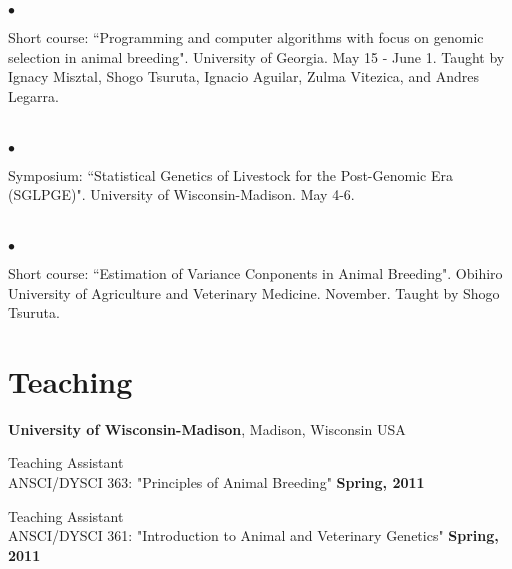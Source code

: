 \documentclass[margin,line,10pt]{res}
\newenvironment{list2}{
  \begin{list}{$\bullet$}{%
      \setlength{\itemsep}{0in}
      \setlength{\parsep}{0in} \setlength{\parskip}{0in}
      \setlength{\topsep}{0in} \setlength{\partopsep}{0in} 
      \setlength{\leftmargin}{0.2in}}}{\end{list}}
\begin{document}
\begin{resume}
\begin{list2}
\vspace{0.5cm}

\item Short course: ``Programming and computer algorithms with focus on genomic selection in animal breeding".  University of Georgia. May 15 - June 1.  
Taught by Ignacy Misztal, Shogo Tsuruta, Ignacio Aguilar, Zulma Vitezica, and  Andres Legarra. 
\end{list2}  

\section{}
\begin{list2}
\item Symposium: ``Statistical Genetics of Livestock for the Post-Genomic Era (SGLPGE)". University of Wisconsin-Madison. May 4-6. 
\end{list2}  

\section{}
\begin{list2}
\item Short course: ``Estimation of Variance Conponents in Animal Breeding". Obihiro University of Agriculture and Veterinary Medicine. November. 
Taught by Shogo Tsuruta.  
\end{list2}  







\vspace{0.5cm}
\section{\sc Teaching}
{\bf University of Wisconsin-Madison}, Madison, Wisconsin USA 
\vspace{.01pt}

Teaching Assistant \\
ANSCI/DYSCI 363: "Principles of Animal Breeding"     \hfill {\bf Spring, 2011}


\vspace{.01pt}
Teaching Assistant \\
ANSCI/DYSCI 361: "Introduction to Animal and Veterinary Genetics"     \hfill {\bf Spring, 2011} 









\end{resume}
\end{document}
